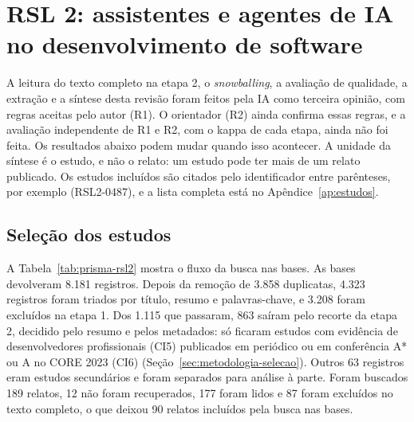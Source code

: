 
\section{RSL 2: assistentes e agentes de IA no desenvolvimento de software}
\label{sec:resultados-rsl2}

A leitura do texto completo na etapa 2, o \textit{snowballing}, a avaliação
de qualidade, a extração e a síntese desta revisão foram feitos pela IA como
terceira opinião, com regras aceitas pelo autor (R1). O orientador (R2) ainda
confirma essas regras, e a avaliação independente de R1 e R2, com o kappa de
cada etapa, ainda não foi feita. Os resultados abaixo podem mudar quando isso
acontecer. A unidade da síntese é o estudo, e não o relato: um estudo pode ter
mais de um relato publicado. Os estudos incluídos são citados pelo
identificador entre parênteses, por exemplo (RSL2-0487), e a lista completa
está no Apêndice~\ref{ap:estudos}.

\subsection{Seleção dos estudos}
\label{sec:resultados-rsl2-selecao}



A Tabela~\ref{tab:prisma-rsl2} mostra o fluxo da busca nas bases. As bases
devolveram 8.181 registros. Depois da remoção de 3.858 duplicatas, 4.323
registros foram triados por título, resumo e palavras-chave, e 3.208 foram
excluídos na etapa 1. Dos 1.115 que passaram, 863 saíram pelo recorte da
etapa 2, decidido pelo resumo e pelos metadados: só ficaram estudos com
evidência de desenvolvedores profissionais (CI5) publicados em periódico ou
em conferência A* ou A no CORE 2023 (CI6)
(Seção~\ref{sec:metodologia-selecao}). Outros 63 registros eram estudos
secundários e foram separados para análise à parte. Foram buscados 189
relatos, 12 não foram recuperados, 177 foram lidos e 87 foram excluídos no
texto completo, o que deixou 90 relatos incluídos pela busca nas bases.

